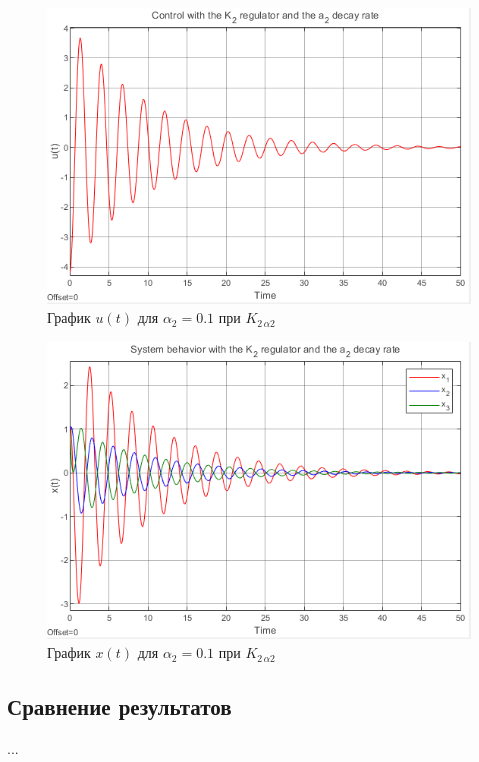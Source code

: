 \documentclass[a4paper, 12pt]{article}
\begin{document}
    \begin{figure}[H]
        \centering
        \includegraphics{1task_K2a2_u.png}
        \captionsetup{skip=0pt}
        \caption{График $u(t)$ для $\alpha_2=0.1$ при $K_{2\,\alpha2}$}
        \label{fig:1task_K2a2_u}
    \end{figure}
    \begin{figure}[H]
        \centering
        \includegraphics{1task_K2a2_x.png}
        \captionsetup{skip=0pt}
        \caption{График $x(t)$ для $\alpha_2=0.1$ при $K_{2\,\alpha2}$}
        \label{fig:1task_K2a2_x}
    \end{figure}


    \subsection{Сравнение результатов}
    ...
\end{document}
